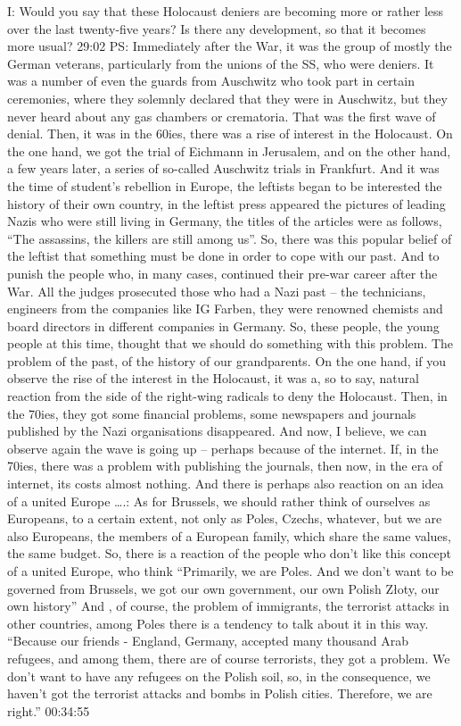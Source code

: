 I: Would you say that these Holocaust deniers are becoming more or rather less over the last twenty-five years? Is there any development, so that it becomes more usual? 29:02
PS: Immediately after the War, it was the group of mostly the German veterans, particularly from the unions of the SS, who were deniers. It was a number of even the guards from Auschwitz who took part in certain ceremonies, where they solemnly declared that they were in Auschwitz, but they never heard about any gas chambers or crematoria. That was the first wave of denial. Then, it was in the 60ies, there was a rise of interest in the Holocaust. On the one hand, we got the trial of Eichmann in Jerusalem, and on the other hand, a few years later, a series of so-called Auschwitz trials in Frankfurt. And it was the time of student’s rebellion in Europe, the leftists began to be interested the history of their own country, in the leftist press appeared the pictures of leading Nazis who were still living in Germany, the titles of the articles were as follows, “The assassins, the killers are still among us”. So, there was this popular belief of the leftist that something must be done in order to cope with our past. And to punish the people who, in many cases, continued their pre-war career after the War. All the judges prosecuted those who had a Nazi past – the technicians, engineers from the companies like IG Farben, they were renowned chemists and board directors in different companies in Germany. So, these people, the young people at this time, thought that we should do something with this problem. The problem of the past, of the history of our grandparents. On the one hand, if you observe the rise of the interest in the Holocaust, it was a, so to say, natural reaction from the side of the right-wing radicals to deny the Holocaust. Then, in the 70ies, they got some financial problems, some newspapers and journals published by the Nazi organisations disappeared. And now, I believe, we can observe again the wave is going up – perhaps because of the internet. If, in the 70ies, there was a problem with publishing the journals, then now, in the era of internet, its costs almost nothing. 
And there is perhaps also reaction on an idea of a united Europe ….: As for Brussels, we should rather think of ourselves as Europeans, to a certain extent, not only as Poles, Czechs, whatever, but we are also Europeans, the members of a European family, which share the same values, the same budget. So, there is a reaction of the people who don’t like this concept of a united Europe, who think “Primarily, we are Poles. And we don’t want to be governed from Brussels, we got our own government, our own Polish Złoty, our own history” And , of course, the problem of immigrants, the terrorist attacks in other countries, among Poles there is a tendency to talk about it in this way. “Because our friends - England, Germany, accepted many thousand Arab refugees, and among them, there are of course terrorists, they got a problem. We don’t want to have any refugees on the Polish soil, so, in the consequence, we haven’t got the terrorist attacks and bombs in Polish cities. Therefore, we are right.” 00:34:55
